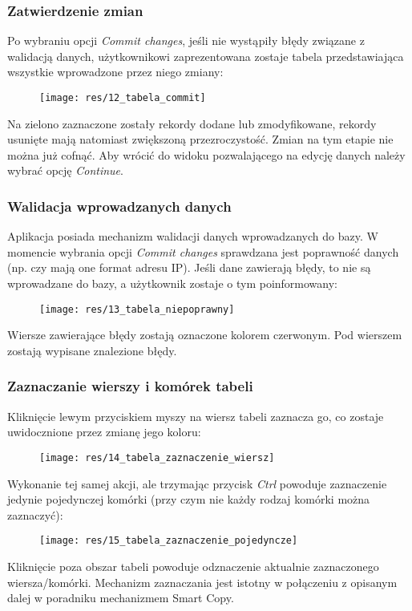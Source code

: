 \documentclass[12pt] {article}
\begin{document}
\subsubsection{Zatwierdzenie zmian}
Po wybraniu opcji \emph{Commit changes}, jeśli nie wystąpiły błędy związane z walidacją danych, użytkownikowi zaprezentowana zostaje tabela przedstawiająca wszystkie wprowadzone przez niego zmiany:
\begin{figure}[H]
\centering
\texttt{[image: res/12\_tabela\_commit]}
\end{figure} 
Na zielono zaznaczone zostały rekordy dodane lub zmodyfikowane, rekordy usunięte mają natomiast zwiększoną przezroczystość. Zmian na tym etapie nie można już cofnąć. Aby wrócić do widoku pozwalającego na edycję danych należy wybrać opcję \emph{Continue}.

\subsubsection{Walidacja wprowadzanych danych}
Aplikacja posiada mechanizm walidacji danych wprowadzanych do bazy. W momencie wybrania opcji \emph{Commit changes} sprawdzana jest poprawność danych (np. czy mają one format adresu IP). Jeśli dane zawierają błędy, to nie są wprowadzane do bazy, a użytkownik zostaje o tym poinformowany:
\begin{figure}[H]
\centering
\texttt{[image: res/13\_tabela\_niepoprawny]}
\end{figure}
Wiersze zawierające błędy zostają oznaczone kolorem czerwonym. Pod wierszem zostają wypisane znalezione błędy. 

\subsubsection{Zaznaczanie wierszy i komórek tabeli}
Kliknięcie lewym przyciskiem myszy na wiersz tabeli zaznacza go, co zostaje uwidocznione przez zmianę jego koloru:
\begin{figure}[H]
\centering
\texttt{[image: res/14\_tabela\_zaznaczenie\_wiersz]}
\end{figure}
Wykonanie tej samej akcji, ale trzymając przycisk \emph{Ctrl} powoduje zaznaczenie jedynie pojedynczej komórki (przy czym nie każdy rodzaj komórki można zaznaczyć):
\begin{figure}[H]
\centering
\texttt{[image: res/15\_tabela\_zaznaczenie\_pojedyncze]}
\end{figure}
Kliknięcie poza obszar tabeli powoduje odznaczenie aktualnie zaznaczonego wiersza/komórki.
Mechanizm zaznaczania jest istotny w połączeniu z opisanym dalej w poradniku mechanizmem Smart Copy. 
\end{document}
